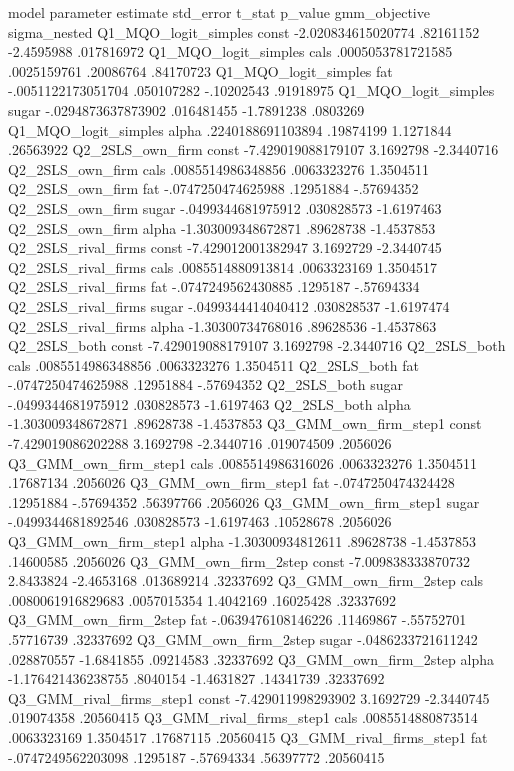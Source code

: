 model	parameter	estimate	std_error	t_stat	p_value	gmm_objective	sigma_nested
Q1_MQO_logit_simples	const	-2.020834615020774	.82161152	-2.4595988	.017816972		
Q1_MQO_logit_simples	cals	.0005053781721585	.0025159761	.20086764	.84170723		
Q1_MQO_logit_simples	fat	-.0051122173051704	.050107282	-.10202543	.91918975		
Q1_MQO_logit_simples	sugar	-.0294873637873902	.016481455	-1.7891238	.0803269		
Q1_MQO_logit_simples	alpha	.2240188691103894	.19874199	1.1271844	.26563922		
Q2_2SLS_own_firm	const	-7.429019088179107	3.1692798	-2.3440716			
Q2_2SLS_own_firm	cals	.0085514986348856	.0063323276	1.3504511			
Q2_2SLS_own_firm	fat	-.0747250474625988	.12951884	-.57694352			
Q2_2SLS_own_firm	sugar	-.0499344681975912	.030828573	-1.6197463			
Q2_2SLS_own_firm	alpha	-1.303009348672871	.89628738	-1.4537853			
Q2_2SLS_rival_firms	const	-7.429012001382947	3.1692729	-2.3440745			
Q2_2SLS_rival_firms	cals	.0085514880913814	.0063323169	1.3504517			
Q2_2SLS_rival_firms	fat	-.0747249562430885	.1295187	-.57694334			
Q2_2SLS_rival_firms	sugar	-.0499344414040412	.030828537	-1.6197474			
Q2_2SLS_rival_firms	alpha	-1.30300734768016	.89628536	-1.4537863			
Q2_2SLS_both	const	-7.429019088179107	3.1692798	-2.3440716			
Q2_2SLS_both	cals	.0085514986348856	.0063323276	1.3504511			
Q2_2SLS_both	fat	-.0747250474625988	.12951884	-.57694352			
Q2_2SLS_both	sugar	-.0499344681975912	.030828573	-1.6197463			
Q2_2SLS_both	alpha	-1.303009348672871	.89628738	-1.4537853			
Q3_GMM_own_firm_step1	const	-7.429019086202288	3.1692798	-2.3440716	.019074509	.2056026	
Q3_GMM_own_firm_step1	cals	.0085514986316026	.0063323276	1.3504511	.17687134	.2056026	
Q3_GMM_own_firm_step1	fat	-.0747250474324428	.12951884	-.57694352	.56397766	.2056026	
Q3_GMM_own_firm_step1	sugar	-.0499344681892546	.030828573	-1.6197463	.10528678	.2056026	
Q3_GMM_own_firm_step1	alpha	-1.30300934812611	.89628738	-1.4537853	.14600585	.2056026	
Q3_GMM_own_firm_2step	const	-7.009838333870732	2.8433824	-2.4653168	.013689214	.32337692	
Q3_GMM_own_firm_2step	cals	.0080061916829683	.0057015354	1.4042169	.16025428	.32337692	
Q3_GMM_own_firm_2step	fat	-.0639476108146226	.11469867	-.55752701	.57716739	.32337692	
Q3_GMM_own_firm_2step	sugar	-.0486233721611242	.028870557	-1.6841855	.09214583	.32337692	
Q3_GMM_own_firm_2step	alpha	-1.176421436238755	.8040154	-1.4631827	.14341739	.32337692	
Q3_GMM_rival_firms_step1	const	-7.429011998293902	3.1692729	-2.3440745	.019074358	.20560415	
Q3_GMM_rival_firms_step1	cals	.0085514880873514	.0063323169	1.3504517	.17687115	.20560415	
Q3_GMM_rival_firms_step1	fat	-.0747249562203098	.1295187	-.57694334	.56397772	.20560415	
